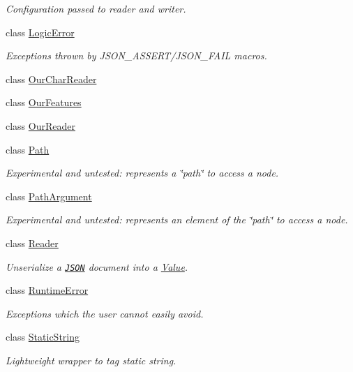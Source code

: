 \begin{DoxyCompactItemize}
\begin{DoxyCompactList}\small\item\em Configuration passed to reader and writer. \end{DoxyCompactList}\item 
class \hyperlink{classJson_1_1LogicError}{Logic\+Error}
\begin{DoxyCompactList}\small\item\em Exceptions thrown by J\+S\+O\+N\+\_\+\+A\+S\+S\+E\+R\+T/\+J\+S\+O\+N\+\_\+\+F\+A\+IL macros. \end{DoxyCompactList}\item 
class \hyperlink{classJson_1_1OurCharReader}{Our\+Char\+Reader}
\item 
class \hyperlink{classJson_1_1OurFeatures}{Our\+Features}
\item 
class \hyperlink{classJson_1_1OurReader}{Our\+Reader}
\item 
class \hyperlink{classJson_1_1Path}{Path}
\begin{DoxyCompactList}\small\item\em Experimental and untested\+: represents a \char`\"{}path\char`\"{} to access a node. \end{DoxyCompactList}\item 
class \hyperlink{classJson_1_1PathArgument}{Path\+Argument}
\begin{DoxyCompactList}\small\item\em Experimental and untested\+: represents an element of the \char`\"{}path\char`\"{} to access a node. \end{DoxyCompactList}\item 
class \hyperlink{classJson_1_1Reader}{Reader}
\begin{DoxyCompactList}\small\item\em Unserialize a \href{http://www.json.org}{\tt J\+S\+ON} document into a \hyperlink{classJson_1_1Value}{Value}. \end{DoxyCompactList}\item 
class \hyperlink{classJson_1_1RuntimeError}{Runtime\+Error}
\begin{DoxyCompactList}\small\item\em Exceptions which the user cannot easily avoid. \end{DoxyCompactList}\item 
class \hyperlink{classJson_1_1StaticString}{Static\+String}
\begin{DoxyCompactList}\small\item\em Lightweight wrapper to tag static string. \end{DoxyCompactList}\item 

\end{DoxyCompactItemize}
